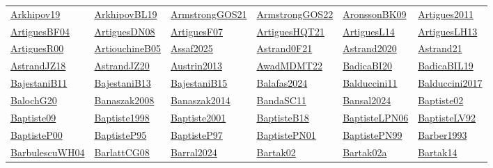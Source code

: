 \begin{longtable}{*{6}{l}}
\hyperref[detail:Arkhipov19]{Arkhipov19} & \hyperref[detail:ArkhipovBL19]{ArkhipovBL19} & \hyperref[detail:ArmstrongGOS21]{ArmstrongGOS21} & \hyperref[detail:ArmstrongGOS22]{ArmstrongGOS22} & \hyperref[detail:AronssonBK09]{AronssonBK09} & \hyperref[detail:Artigues2011]{Artigues2011}\\ 
\hyperref[detail:ArtiguesBF04]{ArtiguesBF04} & \hyperref[detail:ArtiguesDN08]{ArtiguesDN08} & \hyperref[detail:ArtiguesF07]{ArtiguesF07} & \hyperref[detail:ArtiguesHQT21]{ArtiguesHQT21} & \hyperref[detail:ArtiguesL14]{ArtiguesL14} & \hyperref[detail:ArtiguesLH13]{ArtiguesLH13}\\ 
\hyperref[detail:ArtiguesR00]{ArtiguesR00} & \hyperref[detail:ArtiouchineB05]{ArtiouchineB05} & \hyperref[detail:Assaf2025]{Assaf2025} & \hyperref[detail:Astrand0F21]{Astrand0F21} & \hyperref[detail:Astrand2020]{Astrand2020} & \hyperref[detail:Astrand21]{Astrand21}\\ 
\hyperref[detail:AstrandJZ18]{AstrandJZ18} & \hyperref[detail:AstrandJZ20]{AstrandJZ20} & \hyperref[detail:Austrin2013]{Austrin2013} & \hyperref[detail:AwadMDMT22]{AwadMDMT22} & \hyperref[detail:BadicaBI20]{BadicaBI20} & \hyperref[detail:BadicaBIL19]{BadicaBIL19}\\ 
\hyperref[detail:BajestaniB11]{BajestaniB11} & \hyperref[detail:BajestaniB13]{BajestaniB13} & \hyperref[detail:BajestaniB15]{BajestaniB15} & \hyperref[detail:Balafas2024]{Balafas2024} & \hyperref[detail:Balduccini11]{Balduccini11} & \hyperref[detail:Balduccini2017]{Balduccini2017}\\ 
\hyperref[detail:BalochG20]{BalochG20} & \hyperref[detail:Banaszak2008]{Banaszak2008} & \hyperref[detail:Banaszak2014]{Banaszak2014} & \hyperref[detail:BandaSC11]{BandaSC11} & \hyperref[detail:Bansal2024]{Bansal2024} & \hyperref[detail:Baptiste02]{Baptiste02}\\ 
\hyperref[detail:Baptiste09]{Baptiste09} & \hyperref[detail:Baptiste1998]{Baptiste1998} & \hyperref[detail:Baptiste2001]{Baptiste2001} & \hyperref[detail:BaptisteB18]{BaptisteB18} & \hyperref[detail:BaptisteLPN06]{BaptisteLPN06} & \hyperref[detail:BaptisteLV92]{BaptisteLV92}\\ 
\hyperref[detail:BaptisteP00]{BaptisteP00} & \hyperref[detail:BaptisteP95]{BaptisteP95} & \hyperref[detail:BaptisteP97]{BaptisteP97} & \hyperref[detail:BaptistePN01]{BaptistePN01} & \hyperref[detail:BaptistePN99]{BaptistePN99} & \hyperref[detail:Barber1993]{Barber1993}\\ 
\hyperref[detail:BarbulescuWH04]{BarbulescuWH04} & \hyperref[detail:BarlattCG08]{BarlattCG08} & \hyperref[detail:Barral2024]{Barral2024} & \hyperref[detail:Bartak02]{Bartak02} & \hyperref[detail:Bartak02a]{Bartak02a} & \hyperref[detail:Bartak14]{Bartak14}\\ 

\end{longtable}
